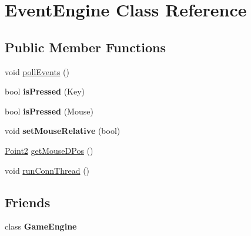 \hypertarget{class_event_engine}{\section{Event\-Engine Class Reference}
\label{class_event_engine}
}
\subsection*{Public Member Functions}
\begin{DoxyCompactItemize}
\item 
void \hyperlink{class_event_engine_ad8ffc6a8f6e6d06ebe53be68b7aab65d}{poll\-Events} ()
\item 
\hypertarget{class_event_engine_a5dbe37ca811a03ac3e711b89ab654ce7}{bool {\bfseries is\-Pressed} (Key)}\label{class_event_engine_a5dbe37ca811a03ac3e711b89ab654ce7}

\item 
\hypertarget{class_event_engine_a9da275853dba48e03421efc7316809b6}{bool {\bfseries is\-Pressed} (Mouse)}\label{class_event_engine_a9da275853dba48e03421efc7316809b6}

\item 
\hypertarget{class_event_engine_aeab62c65bfe7b3fb4dae4668db7781d6}{void {\bfseries set\-Mouse\-Relative} (bool)}\label{class_event_engine_aeab62c65bfe7b3fb4dae4668db7781d6}

\item 
\hyperlink{struct_point2}{Point2} \hyperlink{class_event_engine_adb76bce05a76383698445bb52d309d86}{get\-Mouse\-D\-Pos} ()
\item 
void \hyperlink{class_event_engine_a85ccc82bb8928b096e257ca1a7b70303}{run\-Conn\-Thread} ()
\end{DoxyCompactItemize}
\subsection*{Friends}
\begin{DoxyCompactItemize}
\item 
\hypertarget{class_event_engine_a9ca20b077852bfc7b050d3a6a32d1a40}{class {\bfseries Game\-Engine}}\label{class_event_engine_a9ca20b077852bfc7b050d3a6a32d1a40}

\end{DoxyCompactItemize}


